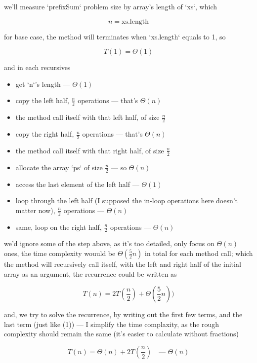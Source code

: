 \documentclass{article}
\theoremstyle{remark}
\begin{document}
\begin{enumerate*}
    \item we'll measure `prefixSum` problem size by array's length of `xs`, which

        \[n = \text{xs.length}\]

        for base case, the method will terminates when `xs.length` equals to 1, so 

        \[T(1) = \Theta(1)\]

        and in each recursives

        \begin{itemize}
            \item get `n`'s length --- $\Theta(1)$
            \item copy the left half, $\frac{n}{2}$ operations --- that's $\Theta(n)$
            \item the method call itself with that left half, of size $\frac{n}{2}$
            \item copy the right half, $\frac{n}{2}$ operations --- that's $\Theta(n)$
            \item the method call itself with that right half, of size $\frac{n}{2}$
            \item allocate the array `ps` of size $\frac{n}{2}$ --- so $\Theta(n)$
            \item access the last element of the left half --- $\Theta(1)$
            \item loop through the left half (I supposed the in-loop operations here doesn't matter now), $\frac{n}{2}$ operations --- $\Theta(n)$
            \item same, loop on the right half, $\frac{n}{2}$ operations --- $\Theta(n)$
        \end{itemize}

        we'd ignore some of the step above, as it's too detailed, only focus on $\Theta(n)$ ones, the time complexity wouuld be $\Theta(\frac{5}{2}n)$ in total for each method call; which the method will recursively call itself, with the left and right half of the initial array as an argument, the recurrence could be written as

        \[\boxed{T(n) = 2T(\frac{n}{2}) + \Theta(\frac{5}{2}n))}\]

        and, we try to solve the recurrence, by writing out the first few terms, and the last term (just like (1)) --- I simplify the time complaxity, as the rough complexity should remain the same (it's easier to calculate without fractions)

        \[T(n) = \Theta(n) + 2T(\frac{n}{2}) \quad \text{--- } \Theta(n)\]


\end{enumerate*}
\end{document}

